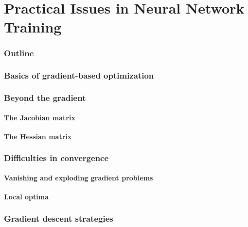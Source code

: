\renewcommand{\thispart}{5 }
\renewcommand{\thispartname}{Practical Issues in Neural Network Training}

\part{\thispartname}

\section{Outline}




\section{Basics of gradient-based optimization}

\section{Beyond the gradient}
\subsection{The Jacobian matrix}

\subsection{The Hessian matrix}


\section{Difficulties in convergence}

\subsection{Vanishing and exploding gradient problems}

\subsection{Local optima}

\section{Gradient descent strategies}

